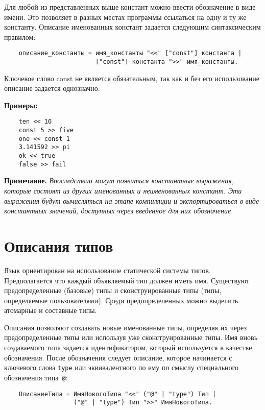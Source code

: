 {Для любой из представленных выше констант можно ввести обозначение в виде имени. Это позволяет в разных местах программы ссылаться на одну и ту же константу. Описание именованных констант задается следующим синтаксическим правилом:

\begin{verbatim}
    описание_константы = имя_константы "<<" ["const"] константа |
                         ["const"] константа ">>" имя_константы.
\end{verbatim}

Ключевое слово const не является обязательным, так как и без его использование описание задается однозначно.

\textbf{Примеры:}

\begin{verbatim}
    ten << 10
    const 5 >> five
    one << const 1
    3.141592 >> pi
    ok << true
    false >> fail
\end{verbatim}

\textbf{Примечание.}
\textit{Впоследствии могут появиться константные выражения, которые состоят из других именованных и неименованных констант. Эти выражения будут вычисляться на этапе компиляции и экспортироваться в виде константных значений, доступных через введенное для них обозначение.}

\section{Описания типов}
\label{smile:type}

Язык ориентирован на использование статической системы типов. Предполагается что каждый объявляемый тип должен иметь имя. Существуют предопределенные (базовые) типы и сконструированные типы (типы, определяемые пользователями). Среди предопределенных можно выделить атомарные и составные типы.

Описания позволяют создавать новые именованные типы, определяя их через предопределенные типы или используя уже сконструированные типы. Имя вновь создаваемого типа задается идентификатором, который используется в качестве обозначения. После обозначения следует описание, которое начинается с ключевого слова \verb|type| или эквивалентного по ему по смыслу специального обозначения типа~\verb|@|:

\begin{verbatim}
    ОписаниеТипа = ИмяНовогоТипа "<<" ("@" | "type") Тип |
                   ("@" | "type") Тип ">>" ИмяНовогоТипа.
\end{verbatim}

}
